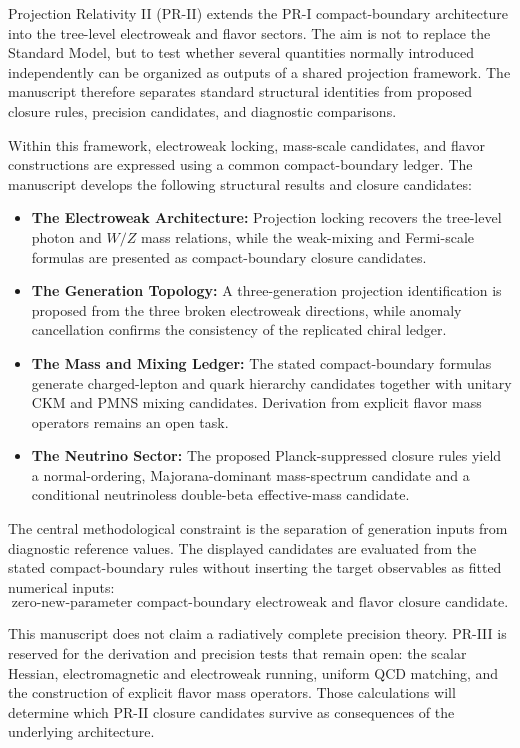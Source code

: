 \documentclass[11pt]{article}
\begin{document}
Projection Relativity II (PR-II) extends the PR-I compact-boundary architecture into the tree-level electroweak and flavor sectors. The aim is not to replace the Standard Model, but to test whether several quantities normally introduced independently can be organized as outputs of a shared projection framework. The manuscript therefore separates standard structural identities from proposed closure rules, precision candidates, and diagnostic comparisons.

Within this framework, electroweak locking, mass-scale candidates, and flavor constructions are expressed using a common compact-boundary ledger. The manuscript develops the following structural results and closure candidates:
\begin{itemize}
    \item \textbf{The Electroweak Architecture:} Projection locking recovers the tree-level photon and \(W/Z\) mass relations, while the weak-mixing and Fermi-scale formulas are presented as compact-boundary closure candidates.
    \item \textbf{The Generation Topology:} A three-generation projection identification is proposed from the three broken electroweak directions, while anomaly cancellation confirms the consistency of the replicated chiral ledger.
    \item \textbf{The Mass and Mixing Ledger:} The stated compact-boundary formulas generate charged-lepton and quark hierarchy candidates together with unitary CKM and PMNS mixing candidates. Derivation from explicit flavor mass operators remains an open task.
    \item \textbf{The Neutrino Sector:} The proposed Planck-suppressed closure rules yield a normal-ordering, Majorana-dominant mass-spectrum candidate and a conditional neutrinoless double-beta effective-mass candidate.
\end{itemize}

The central methodological constraint is the separation of generation inputs from diagnostic reference values. The displayed candidates are evaluated from the stated compact-boundary rules without inserting the target observables as fitted numerical inputs:
\begin{equation}
\boxed{
\text{zero-new-parameter compact-boundary electroweak and flavor closure candidate.}
}
\end{equation}

This manuscript does not claim a radiatively complete precision theory. PR-III is reserved for the derivation and precision tests that remain open: the scalar Hessian, electromagnetic and electroweak running, uniform QCD matching, and the construction of explicit flavor mass operators. Those calculations will determine which PR-II closure candidates survive as consequences of the underlying architecture.
\end{document}
